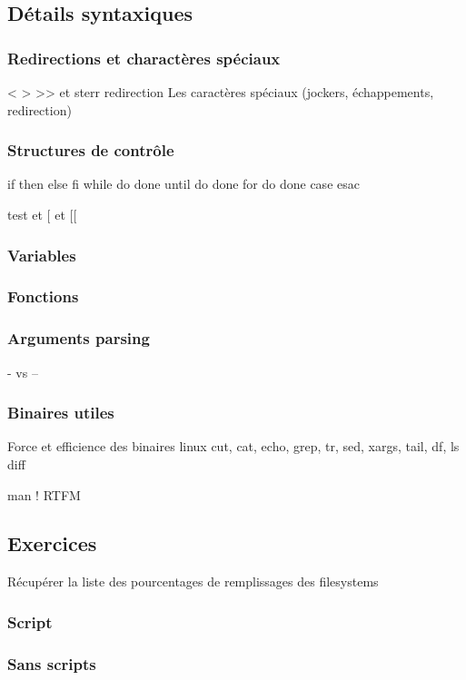 \documentclass[11pt,a4paper]{article}
\begin{document}
\subsection{Détails syntaxiques}
\subsubsection{Redirections et charactères spéciaux}
< > >> et sterr redirection
Les caractères spéciaux (jockers, échappements, redirection)\\

\subsubsection{Structures de contrôle}
if then else fi
while do done
until do done
for do done
case esac

test et [ et [[

\subsubsection{Variables}


\subsubsection{Fonctions}
\subsubsection{Arguments parsing}
- vs --

\subsubsection{Binaires utiles}
Force et efficience des binaires linux
cut, cat, echo, grep, tr, sed, xargs, tail, df, ls
diff

man ! RTFM
\subsection{Exercices}
Récupérer la liste des pourcentages de remplissages des filesystems

\subsubsection{Script}

\subsubsection{Sans scripts}
\end{document}
